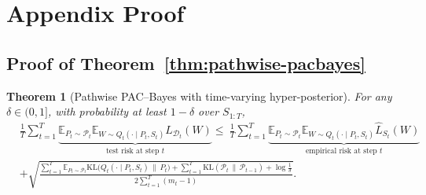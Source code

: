 \documentclass[10pt]{article} %
\newtheorem{theorem}{Theorem}
\begin{document}




\appendix
\section{Appendix Proof}

\subsection{Proof of Theorem~\ref{thm:pathwise-pacbayes}}

\begin{theorem}[Pathwise PAC--Bayes with time-varying hyper-posterior]
For any $\delta\in(0,1]$, with probability at least $1-\delta$ over $S_{1:T}$,
\begin{equation}
\begin{aligned} 
& \frac{1}{T} \sum_{t=1}^T \underbrace{\mathbb{E}_{P_t \sim \mathcal{P}_t} \mathbb{E}_{W \sim Q_t(\cdot \mid P_t, S_t)} L_{\mathcal{D}_t}(W)}_{\text{test risk at step } t} 
\le \ \frac{1}{T} \sum_{t=1}^T \underbrace{\mathbb{E}_{P_t \sim \mathcal{P}_t} \mathbb{E}_{W \sim Q_t(\cdot \mid P_t, S_t)} \hat{L}_{S_t}(W)}_{\text{empirical risk at step } t} \\ 
& + \sqrt{\frac{ \sum_{t=1}^T \mathbb{E}_{P_t \sim \mathcal{P}_t} \mathrm{KL}\big(Q_t(\cdot \mid P_t, S_t) \,\|\, P_t\big) + \sum_{t=1}^T \mathrm{KL}(\mathcal{P}_t \,\|\, \mathcal{P}_{t-1}) + \log\frac{1}{\delta} }{2 \sum_{t=1}^T (m_t - 1)}}. 
\end{aligned} 
\end{equation}
\end{theorem}
\end{document}
